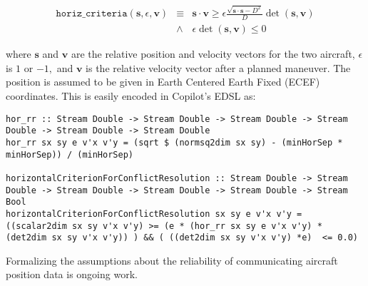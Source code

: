 \begin{eqnarray*} \texttt{horiz\_criteria}(\bm{s}, \epsilon, \bm{v})
& \equiv &  \bm{s} \cdot \bm{v} \geq \epsilon  \frac{\sqrt{\bm{s} \cdot
  \bm{s}  - D^2}} {D} \operatorname{det}(\bm{s},\bm{v})  \\
& \wedge &  \epsilon \operatorname{det}(\bm{s},\bm{v})  \leq  0 
\end{eqnarray*}


where $\bm{s}$ and $\bm{v}$ are the  relative position  and velocity
vectors for the two aircraft, $\epsilon$ is $1$ or $-1,$  and 
$\bm{v}$ is the relative velocity vector after a planned maneuver. 
The position is  assumed to be given in Earth Centered Earth Fixed (ECEF)
coordinates.  This is easily encoded in  Copilot's EDSL as:

%
%
%
%
\begin{lstlisting}[frame=single]
hor_rr :: Stream Double -> Stream Double -> Stream Double -> Stream Double -> Stream Double -> Stream Double
hor_rr sx sy e v'x v'y = (sqrt $ (normsq2dim sx sy) - (minHorSep * minHorSep)) / (minHorSep)

horizontalCriterionForConflictResolution :: Stream Double -> Stream Double -> Stream Double -> Stream Double -> Stream Double -> Stream Bool
horizontalCriterionForConflictResolution sx sy e v'x v'y = ((scalar2dim sx sy v'x v'y) >= (e * (hor_rr sx sy e v'x v'y) * (det2dim sx sy v'x v'y)) ) && ( ((det2dim sx sy v'x v'y) *e)  <= 0.0)
\end{lstlisting}

Formalizing the assumptions about the reliability of communicating
aircraft position data is ongoing work. 


 








